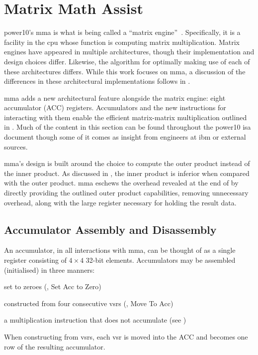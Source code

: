 \documentclass[\main/thesis.tex]{subfiles}
\begin{document}
\chapter{Matrix Math Assist}
\label{cha:mma}

\Gls{power10}'s \gls{mma} is what is being called a ``matrix engine''~\autocite{domke2021matrix}.
Specifically, it is a facility in the \gls{cpu} whose function is computing matrix multiplication.
Matrix engines have appeared in multiple architectures, though their implementation and design choices differ.
Likewise, the algorithm for optimally making use of each of these architectures differs.
While this work focuses on \gls{mma}, a discussion of the differences in these architectural implementations follows in .

\gls{mma} adds a new architectural feature alongside the matrix engine: eight accumulator (ACC) registers.
Accumulators and the new instructions for interacting with them enable the efficient matrix-matrix multiplication outlined in .
Much of the content in this section can be found throughout the \gls{power10} \gls{isa} document though some of it comes as insight from engineers at \gls{ibm} or external sources.

\Gls{mma}'s design is built around the choice to compute the outer product instead of the inner product.
As discussed in , the inner product is inferior when compared with the outer product.
\Gls{mma} eschews the overhead revealed at the end of  by directly providing the outlined outer product capabilities, removing unnecessary overhead, along with the large register necessary for holding the result data.

\section{Accumulator Assembly and Disassembly}
\label{sec:assDis}
An accumulator, in all interactions with \gls{mma}, can be thought of as a single register consisting of $4 \times 4$ 32-bit elements.
Accumulators may be assembled (initialised) in three manners:
\begin{enumerate*}[itemjoin*={{ and }}, label=\textbf{(\arabic*)}, after={.}]
  \item set to zeroes (, Set Acc to Zero)
  \item constructed from four consecutive \glspl{vsr} (, Move To Acc)
  \item a multiplication instruction that does not accumulate (see )
\end{enumerate*}
When constructing from \glspl{vsr}, each \gls{vsr} is moved into the ACC and becomes one row of the resulting accumulator.\footnotemark
{}
\end{document}
